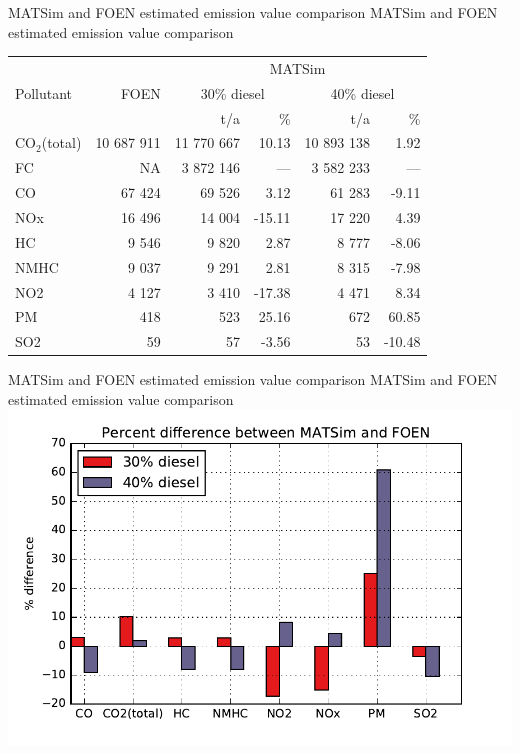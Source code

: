 \createtable%
{MATSim and FOEN estimated emission value comparison}%
{MATSim and FOEN estimated emission value comparison}%
{\label{tab:emissionValueMatsimFoenComparison}}%
{%
  \begin{tabular}[c]{lrrrrr}
    \toprule
    \multirow{3}{*}{Pollutant} & \multirow{3}{*}{FOEN} & \multicolumn{4}{c}{MATSim} \\ 
    & & \multicolumn{2}{c}{30\% diesel} & \multicolumn{2}{c}{40\% diesel}\\
    & t/a & t/a & \% & t/a & \% \\
    \midrule
    CO$_2$(total) & 10 687 911 & 11 770 667 &  10.13 &  10 893 138 &   1.92 \\
    FC &                    NA &  3 872 146 &    --- &   3 582 233 &    --- \\
    CO &                67 424 &     69 526 &   3.12 &      61 283 &  -9.11 \\
    NOx &               16 496 &     14 004 & -15.11 &      17 220 &   4.39 \\
    HC &                 9 546 &      9 820 &   2.87 &       8 777 &  -8.06 \\
    NMHC &               9 037 &      9 291 &   2.81 &       8 315 &  -7.98 \\
    NO2 &                4 127 &      3 410 & -17.38 &       4 471 &   8.34 \\
    PM &                   418 &        523 &  25.16 &         672 &  60.85 \\
    SO2 &                   59 &         57 &  -3.56 &          53 & -10.48 \\
    \bottomrule
  \end{tabular}
}%
{}

\createfigure%
{MATSim and FOEN estimated emission value comparison}%
{MATSim and FOEN estimated emission value comparison}%
{\label{fig:emissionValueMatsimFoenComparison}}%
{\includegraphics[width=1.0\textwidth, angle=0]{figures/percent_differences.pdf}}%
{}

